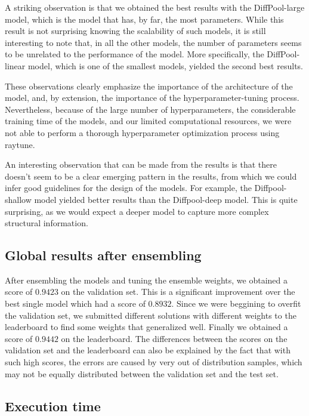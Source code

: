 \documentclass[switch, 11pt]{article}
\begin{document}
\begin{multicols}{2}
    A striking observation is that we obtained the best results with the DiffPool-large model, which is the model that has, by far, the most parameters. While this result is not surprising knowing the scalability of such models, it is still interesting to note that, in all the other models, the number of parameters seems to be unrelated to the performance of the model. More specifically, the DiffPool-linear model, which is one of the smallest models, yielded the second best results.

    These observations clearly emphasize the importance of the architecture of the model, and, by extension, the importance of the hyperparameter-tuning process. Nevertheless, because of the large number of hyperparameters, the considerable training time of the models, and our limited computational resources, we were not able to perform a thorough hyperparameter optimization process using raytune.

    An interesting observation that can be made from the results is that there doesn't seem to be a clear emerging pattern in the results, from which we could infer good guidelines for the design of the models. For example, the Diffpool-shallow model yielded better results than the Diffpool-deep model. This is quite surprising, as we would expect a deeper model to capture more complex structural information.


    \subsection{Global results after ensembling}
    After ensembling the models and tuning the ensemble weights, we obtained a score of $0.9423$ on the validation set. This is a significant improvement over the best single model which had a score of $0.8932$. Since we were beggining to overfit the validation set, we submitted different solutions with different weights to the leaderboard to find some weights that generalized well. Finally we obtained a score of $0.9442$ on the leaderboard. The differences between the scores on the validation set and the leaderboard can also be explained by the fact that with such high scores, the errors are caused by very out of distribution samples, which may not be equally distributed between the validation set and the test set.

    \subsection{Execution time}


\end{multicols}
\end{document}
